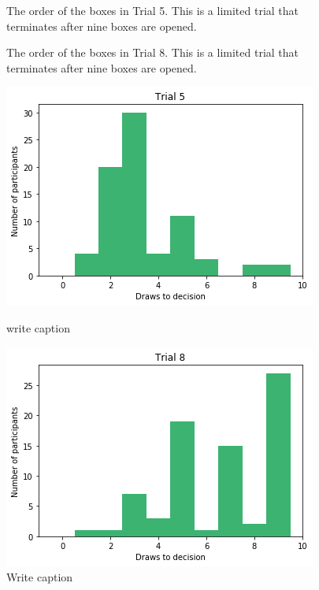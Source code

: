 \begin{figure}
    \centering
    \scalebox{0.8}{}
    \caption[Order of boxes in Trial 5]{The order of the boxes in Trial 5. This is a limited trial that terminates after nine boxes are opened.}
    \label{fig:trial5_order}
\end{figure}
\begin{figure}
    \centering
    \scalebox{0.8}{}
    \caption[Order of boxes in Trial 8]{The order of the boxes in Trial 8. This is a limited trial that terminates after nine boxes are opened.}
    \label{fig:trial8_order}
\end{figure}
\begin{figure}
    \centering
    \begin{minipage}{0.45\textwidth} 
        \centering
        \includegraphics[scale=0.4]{pictures/dtd5_histogram.png}
        \caption[Draws to decisions in Trial 5]{write caption}
        \label{fig:histogram_trial5}
    \end{minipage}\hfill
    \begin{minipage}{0.45\textwidth} 
        \centering
        \includegraphics[scale=0.4]{pictures/dtd8_histogram.png}
        \caption[Draws to decisions in Trial 8]{Write caption}
        \label{fig:histogram_trial8}
    \end{minipage}
\end{figure}

